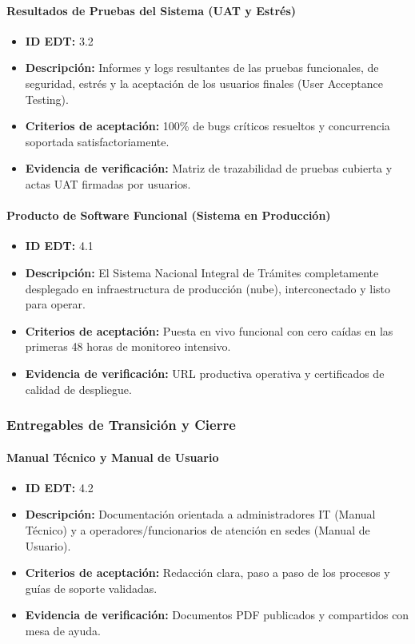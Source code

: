 \paragraph{Resultados de Pruebas del Sistema (UAT y Estrés)}
\begin{itemize}
    \item \textbf{ID EDT:} 3.2
    \item \textbf{Descripción:} Informes y logs resultantes de las pruebas funcionales, de seguridad, estrés y la aceptación de los usuarios finales (User Acceptance Testing).
    \item \textbf{Criterios de aceptación:} 100\% de bugs críticos resueltos y concurrencia soportada satisfactoriamente.
    \item \textbf{Evidencia de verificación:} Matriz de trazabilidad de pruebas cubierta y actas UAT firmadas por usuarios.
\end{itemize}

\paragraph{Producto de Software Funcional (Sistema en Producción)}
\begin{itemize}
    \item \textbf{ID EDT:} 4.1
    \item \textbf{Descripción:} El Sistema Nacional Integral de Trámites completamente desplegado en infraestructura de producción (nube), interconectado y listo para operar.
    \item \textbf{Criterios de aceptación:} Puesta en vivo funcional con cero caídas en las primeras 48 horas de monitoreo intensivo.
    \item \textbf{Evidencia de verificación:} URL productiva operativa y certificados de calidad de despliegue.
\end{itemize}

\subsubsection{Entregables de Transición y Cierre}

\paragraph{Manual Técnico y Manual de Usuario}
\begin{itemize}
    \item \textbf{ID EDT:} 4.2
    \item \textbf{Descripción:} Documentación orientada a administradores IT (Manual Técnico) y a operadores/funcionarios de atención en sedes (Manual de Usuario).
    \item \textbf{Criterios de aceptación:} Redacción clara, paso a paso de los procesos y guías de soporte validadas.
    \item \textbf{Evidencia de verificación:} Documentos PDF publicados y compartidos con mesa de ayuda.
\end{itemize}

